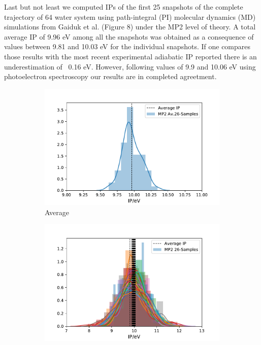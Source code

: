 \documentclass[12pt,a4paper]{article}
\begin{document}
Last but not least we computed IPs of the first 25 snapshots of the complete trajectory of 64 water system using path-integral (PI) molecular
dynamics (MD) simulations from Gaiduk et al. \cite{gaiduk2018electron} (Figure 8) under the MP2 level of theory.
A total average IP of 9.96 eV among all the snapshots was obtained as a consequence of values between 9.81 and 10.03 eV
for the individual snapshots. If one compares those results with the most recent experimental adiabatic IP reported 
\cite{perry2020ionization} there is an underestimation of ~0.16 eV. 
However, following values of 9.9 \cite{winter2004full}and 10.06 eV \cite{kurahashi2014photoelectron} using photoelectron spectroscopy
our results are in completed agreetment.

\begin{figure}[!ht]
        \captionsetup[subfigure]{labelformat=empty}
        \centering
        \begin{subfigure}{0.4\linewidth}
                \includegraphics[width=\linewidth]{average30}
                \caption{Average}
        \end{subfigure}
        \begin{subfigure}{0.4\linewidth}
                \includegraphics[width=\linewidth]{total30}

\end{subfigure}
\end{figure}
\end{document}
